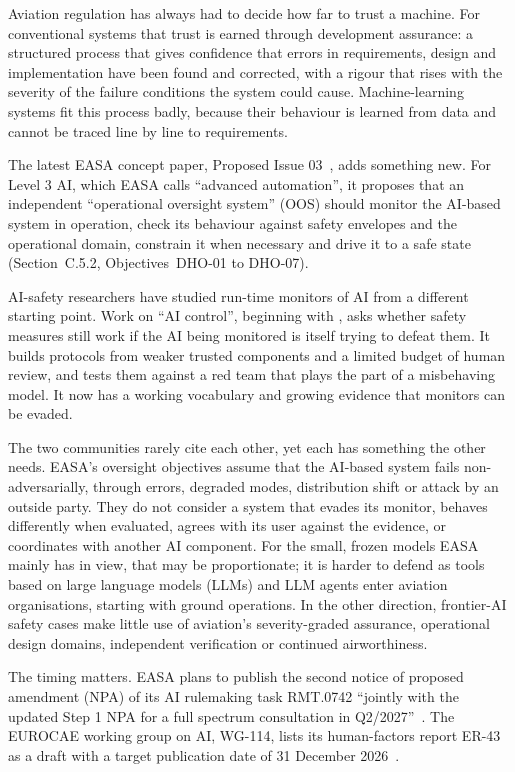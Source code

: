\documentclass{aer}
\begin{document}
Aviation regulation has always had to decide how far to trust a machine. For conventional systems that trust is earned through development assurance: a structured process that gives confidence that errors in requirements, design and implementation have been found and corrected, with a rigour that rises with the severity of the failure conditions the system could cause. Machine-learning systems fit this process badly, because their behaviour is learned from data and cannot be traced line by line to requirements.

The latest EASA concept paper, Proposed Issue 03~\citeyearpar{easa2026concept}, adds something new. For Level 3 AI, which EASA calls ``advanced automation'', it proposes that an independent ``operational oversight system'' (OOS) should monitor the AI-based system in operation, check its behaviour against safety envelopes and the operational domain, constrain it when necessary and drive it to a safe state (Section~C.5.2, Objectives~DHO-01 to DHO-07).

AI-safety researchers have studied run-time monitors of AI from a different starting point. Work on ``AI control'', beginning with \citet{greenblatt2023control}, asks whether safety measures still work if the AI being monitored is itself trying to defeat them. It builds protocols from weaker trusted components and a limited budget of human review, and tests them against a red team that plays the part of a misbehaving model. It now has a working vocabulary and growing evidence that monitors can be evaded.

The two communities rarely cite each other, yet each has something the other needs. EASA's oversight objectives assume that the AI-based system fails non-adversarially, through errors, degraded modes, distribution shift or attack by an outside party. They do not consider a system that evades its monitor, behaves differently when evaluated, agrees with its user against the evidence, or coordinates with another AI component. For the small, frozen models EASA mainly has in view, that may be proportionate; it is harder to defend as tools based on large language models (LLMs) and LLM agents enter aviation organisations, starting with ground operations. In the other direction, frontier-AI safety cases make little use of aviation's severity-graded assurance, operational design domains, independent verification or continued airworthiness.

The timing matters. EASA plans to publish the second notice of proposed amendment (NPA) of its AI rulemaking task RMT.0742 ``jointly with the updated Step 1 NPA for a full spectrum consultation in Q2/2027''~\citeyearpar[slide~17]{easa2026aidays}. The EUROCAE working group on AI, WG-114, lists its human-factors report ER-43 as a draft with a target publication date of 31 December 2026~\citep{eurocaewg114}.
\end{document}
